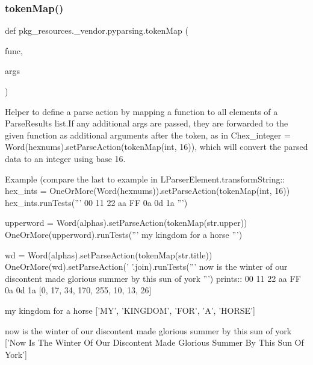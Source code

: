 \subsubsection{\texorpdfstring{token\+Map()}{tokenMap()}}
{\footnotesize\ttfamily def pkg\+\_\+resources.\+\_\+vendor.\+pyparsing.\+token\+Map (\begin{DoxyParamCaption}\item[{}]{func,  }\item[{}]{args }\end{DoxyParamCaption})}

\begin{DoxyVerb}Helper to define a parse action by mapping a function to all elements of a ParseResults list.If any additional 
args are passed, they are forwarded to the given function as additional arguments after
the token, as in C{hex_integer = Word(hexnums).setParseAction(tokenMap(int, 16))}, which will convert the
parsed data to an integer using base 16.

Example (compare the last to example in L{ParserElement.transformString}::
    hex_ints = OneOrMore(Word(hexnums)).setParseAction(tokenMap(int, 16))
    hex_ints.runTests('''
        00 11 22 aa FF 0a 0d 1a
        ''')
    
    upperword = Word(alphas).setParseAction(tokenMap(str.upper))
    OneOrMore(upperword).runTests('''
        my kingdom for a horse
        ''')

    wd = Word(alphas).setParseAction(tokenMap(str.title))
    OneOrMore(wd).setParseAction(' '.join).runTests('''
        now is the winter of our discontent made glorious summer by this sun of york
        ''')
prints::
    00 11 22 aa FF 0a 0d 1a
    [0, 17, 34, 170, 255, 10, 13, 26]

    my kingdom for a horse
    ['MY', 'KINGDOM', 'FOR', 'A', 'HORSE']

    now is the winter of our discontent made glorious summer by this sun of york
    ['Now Is The Winter Of Our Discontent Made Glorious Summer By This Sun Of York']
\end{DoxyVerb}
 \mbox{\label{namespacepkg__resources_1_1__vendor_1_1pyparsing_a40721f1128175810125acdda60e50294}} 
